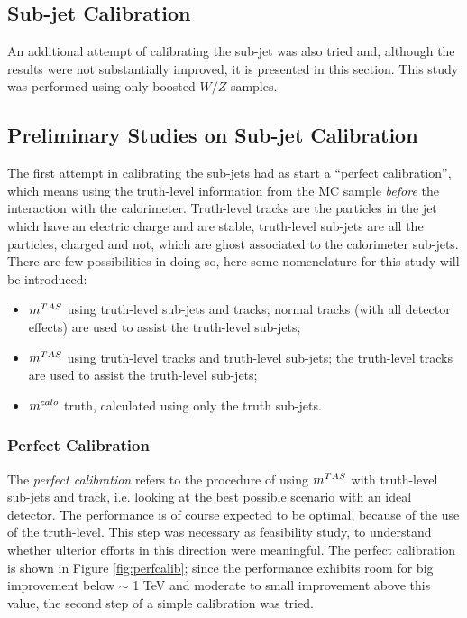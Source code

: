\subsection{Sub-jet Calibration}

An additional attempt of calibrating the sub-jet was also tried and, although the results were not substantially improved, it is presented in this section. This study was performed using only boosted $W/Z$ samples.

\subsection{Preliminary Studies on Sub-jet Calibration}
The first attempt in calibrating the sub-jets had as start a ``perfect calibration'', which means using the truth-level information from the MC sample \textit{before} the interaction with the calorimeter.
Truth-level tracks are the particles in the jet which have an electric charge and are stable, truth-level sub-jets are all the particles, charged and not, which are ghost associated to the calorimeter sub-jets.
There are few possibilities in doing so, here some nomenclature for this study will be introduced:
\begin{itemize}
 \item $m^{TAS}$ using truth-level sub-jets and tracks; normal tracks (with all detector effects) are used to assist the truth-level sub-jets;
 \item $m^{TAS}$ using truth-level tracks and truth-level sub-jets; the truth-level tracks are used to assist the truth-level sub-jets;
 \item $m^{calo}$ truth, calculated using only the truth sub-jets.
\end{itemize}


\subsubsection{Perfect Calibration}
The \textit{perfect calibration} refers to the procedure of using $m^{TAS}$ with truth-level sub-jets and track, i.e. looking at the best possible scenario with an ideal detector. The performance is of course expected to be optimal, because of the use of the truth-level. This step was necessary as feasibility study, to understand whether ulterior efforts in this direction were meaningful.
The perfect calibration is shown in Figure \ref{fig:perfcalib}; since the performance exhibits room for big improvement below $\sim$ 1 TeV and moderate to small improvement above this value, the second step of a simple calibration was tried.

